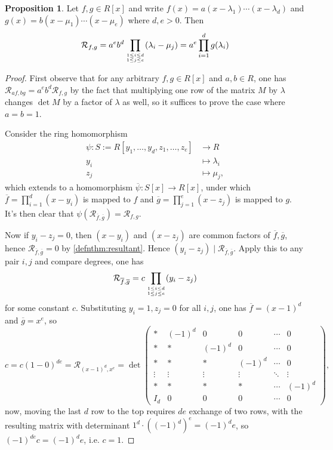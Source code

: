 \documentclass{article}
\newcommand{\re}{\mathcal{R}}
\theoremstyle{definition}
\newtheorem{prop}[defn]{Proposition}
\begin{document}
\begin{prop}
\label{prop:explicitresultant}
Let $f,g\in R[x]$ and write $f(x)=a(x-\lambda_1)\cdots(x-\lambda_d)$ and $g(x)=b(x-\mu_1)\cdots(x-\mu_e)$ where $d,e>0$. Then
\[
\re_{f,g}=a^eb^d\prod_{1\leq i\leq d\atop 1\leq j\leq e}(\lambda_i-\mu_j)=a^e\prod_{i=1}^d g(\lambda_i)
\]
\end{prop}
\begin{proof}
First observe that for any arbitrary $f,g\in R[x]$ and $a,b\in R$, one has $\re_{af,bg}=a^eb^d\re_{f,g}$ by the fact that multiplying one row of the matrix $M$ by $\lambda$ changes $\det M$ by a factor of $\lambda$ as well, so it suffices to prove the case where $a=b=1$.

Consider the ring homomorphism
\[
\begin{aligned}
\psi:S:=R[y_1,\ldots,y_d,z_1,\ldots,z_e]&\rightarrow R \\
y_i&\mapsto\lambda_i \\
z_j&\mapsto\mu_j,
\end{aligned}
\]
which extends to a homomorphism $\overline\psi:S[x]\rightarrow R[x]$, under which $\overline f=\prod_{i=1}^d(x-y_i)$ is mapped to $f$ and $\overline g=\prod_{j=1}^e(x-z_j)$ is mapped to $g$. It's then clear that $\psi\left(\re_{\overline f,\overline g}\right)=\re_{f,g}$.

Now if $y_i-z_j=0$, then $(x-y_i)$ and $(x-z_j)$ are common factors of $\overline f,\overline g$, hence $\re_{\overline f,\overline g}=0$ by \ref{defnthm:resultant}. Hence $(y_i-z_j)\mid\re_{\overline f,\overline g}$. Apply this to any pair $i,j$ and compare degrees, one has
\[
\re_{\overline f,\overline g}=c\prod_{1\leq i\leq d\atop 1\leq j\leq e}(y_i-z_j)
\]
for some constant $c$. Substituting $y_i=1,z_j=0$ for all $i,j$, one has $\overline f=(x-1)^d$ and $\overline g=x^e$, so
\[
c=c(1-0)^{de}=\re_{(x-1)^d,x^e}=\det\left(
\begin{array}{c|cccccc}
\ast & (-1)^d & 0 & 0 & \cdots & 0 \\
\ast & \ast & (-1)^d & 0 & \cdots & 0 \\
\ast & \ast & \ast & (-1)^d & \cdots & 0 \\
\vdots & \vdots & \vdots & \vdots & \ddots & \vdots \\
\ast & \ast & \ast & \ast & \cdots & (-1)^d \\ \hline
I_d & 0 & 0 & 0 & \cdots & 0
\end{array}\right),
\]
now, moving the last $d$ row to the top requires $de$ exchange of two rows, with the resulting matrix with determinant $1^d\cdot \left((-1)^d\right)^e=(-1)^de$, so $(-1)^{de}c=(-1)^de$, i.e. $c=1$.
\end{proof}
\end{document}
